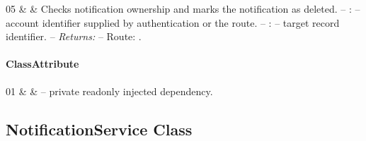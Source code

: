 \begin{ClassMethodTable}
05 &  &
Checks notification ownership and marks the notification as deleted.
\newline -- :  -- account identifier supplied by authentication or the route.
\newline -- :  -- target record identifier.
\newline -- \textit{Returns:} 
\newline -- Route: .
 \\ \hline

\end{ClassMethodTable}

\paragraph{ClassAttribute}
\begin{ClassAttributeTable}
01 &  &  -- private readonly injected dependency. \\ \hline
\end{ClassAttributeTable}

\subsection{NotificationService Class}
\label{cls:nhuy-NotificationService}

